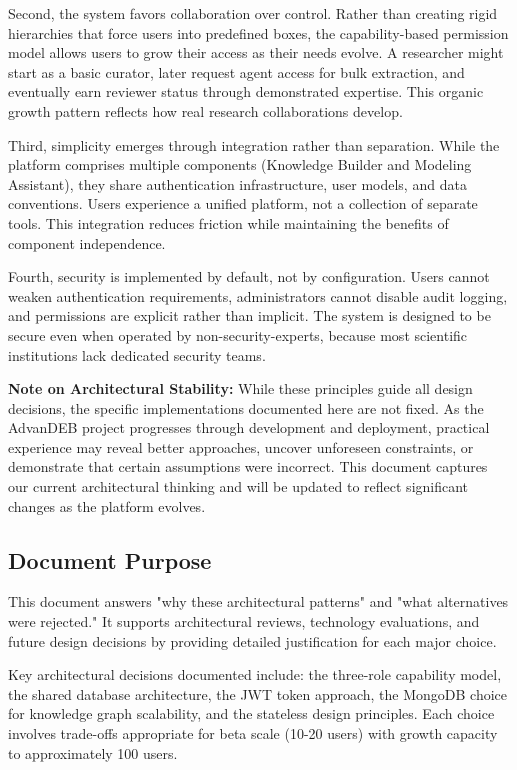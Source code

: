 \documentclass[12pt,a4paper]{article}
\begin{document}
Second, the system favors collaboration over control. Rather than creating rigid hierarchies that force users into predefined boxes, the capability-based permission model allows users to grow their access as their needs evolve. A researcher might start as a basic curator, later request agent access for bulk extraction, and eventually earn reviewer status through demonstrated expertise. This organic growth pattern reflects how real research collaborations develop.

Third, simplicity emerges through integration rather than separation. While the platform comprises multiple components (Knowledge Builder and Modeling Assistant), they share authentication infrastructure, user models, and data conventions. Users experience a unified platform, not a collection of separate tools. This integration reduces friction while maintaining the benefits of component independence.

Fourth, security is implemented by default, not by configuration. Users cannot weaken authentication requirements, administrators cannot disable audit logging, and permissions are explicit rather than implicit. The system is designed to be secure even when operated by non-security-experts, because most scientific institutions lack dedicated security teams.

\textbf{Note on Architectural Stability:} While these principles guide all design decisions, the specific implementations documented here are not fixed. As the AdvanDEB project progresses through development and deployment, practical experience may reveal better approaches, uncover unforeseen constraints, or demonstrate that certain assumptions were incorrect. This document captures our current architectural thinking and will be updated to reflect significant changes as the platform evolves.

\subsection{Document Purpose}

This document answers "why these architectural patterns" and "what alternatives were rejected." It supports architectural reviews, technology evaluations, and future design decisions by providing detailed justification for each major choice.

Key architectural decisions documented include: the three-role capability model, the shared database architecture, the JWT token approach, the MongoDB choice for knowledge graph scalability, and the stateless design principles. Each choice involves trade-offs appropriate for beta scale (10-20 users) with growth capacity to approximately 100 users.
\end{document}
